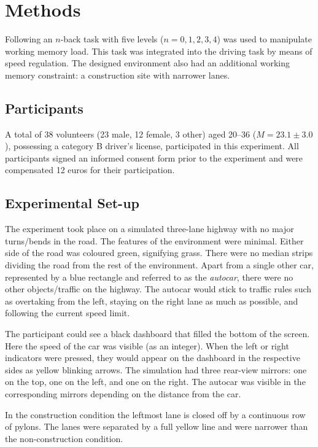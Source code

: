 
\section{Methods}\label{sec:methods}
Following \cite{Unni2017} an \(n\)-back task with five levels (\(n = 0,1,2,3,4\)) was used to manipulate working memory load. 
This task was integrated into the driving task by means of speed regulation. 
The designed environment also had an additional working memory constraint: a construction site with narrower lanes.  

\subsection{Participants}
A total of 38 volunteers (23 male, 12 female, 3 other) aged 20--36 (\(M = 23.1 \pm 3.0\)), possessing a category B driver's license, participated in this experiment. 
All participants signed an informed consent form prior to the experiment and were compensated 12 euros for their participation.

\subsection{Experimental Set-up}
The experiment took place on a simulated three-lane highway with no major turns/bends in the road. 
The features of the environment were minimal. 
Either side of the road was coloured green, signifying grass. 
There were no median strips dividing the road from the rest of the environment. 
Apart from a single other car, represented by a blue rectangle and referred to as the \textit{autocar}, there were no other objects/traffic on the highway. 
The autocar would stick to traffic rules such as overtaking from the left, staying on the right lane as much as possible, and following the current speed limit. 

The participant could see a black dashboard that filled the bottom of the screen. 
Here the speed of the car was visible (as an integer). 
When the left or right indicators were pressed, they would appear on the dashboard in the respective sides as yellow blinking arrows. 
The simulation had three rear-view mirrors: one on the top, one on the left, and one on the right. 
The autocar was visible in the corresponding mirrors depending on the distance from the car. 

In the construction condition the leftmost lane is closed off by a continuous row of pylons. 
The lanes were separated by a full yellow line and were narrower than the non-construction condition. 

